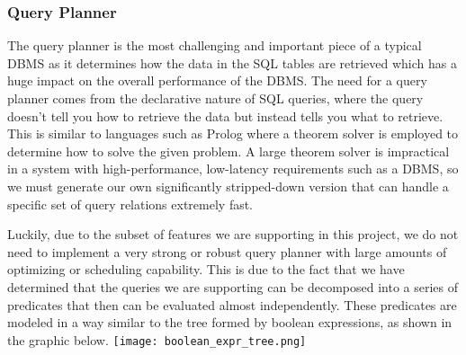 \documentclass[letterpaper, 12pt]{article}
\renewcommand{\includegraphics}[2][]{\fbox{}}
\begin{document}
\subsubsection{Query Planner}
The query planner is the most challenging and important piece of a typical DBMS as it
determines how the data in the SQL tables are retrieved which has a huge impact on 
the overall performance of the DBMS. The need for a query planner comes from the 
declarative nature of SQL queries, where the query doesn't tell you how to retrieve the
data but instead tells you what to retrieve. This is similar to languages such as Prolog where
a theorem solver is employed to determine how to solve the given problem. A large theorem 
solver is impractical in a system with high-performance, low-latency requirements such as 
a DBMS, so we must generate our own significantly stripped-down version that can handle a 
specific set of query relations extremely fast.
\par\vspace{\baselineskip}
Luckily, due to the subset of features we are supporting in this project, we do not need to 
implement a very strong or robust query planner with large amounts of optimizing or scheduling 
capability. This is due to the fact that we have determined that the queries we are supporting
can be decomposed into a series of predicates that then can be evaluated almost independently.
These predicates are modeled in a way similar to the tree formed by boolean expressions, as shown
in the graphic below.
\texttt{[image: boolean\_expr\_tree.png]}
\end{document}
